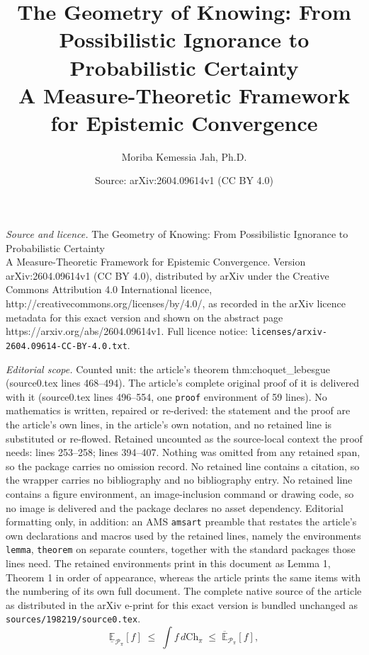 \documentclass[10pt,a4paper]{amsart}
\title{The Geometry of Knowing: From Possibilistic Ignorance to Probabilistic Certainty\\[6pt] \large A Measure-Theoretic Framework for Epistemic Convergence}
\author{Moriba Kemessia Jah, Ph.D.}
\date{Source: arXiv:2604.09614v1 (CC BY 4.0)}
\newcommand{\E}{\mathbb{E}}
\newcommand{\Ppi}{\mathcal{P}_\pi}
\begin{document}
\maketitle

\noindent\emph{Source and licence.} The Geometry of Knowing: From Possibilistic Ignorance to Probabilistic Certainty\\[6pt] \large A Measure-Theoretic Framework for Epistemic Convergence. Version arXiv:2604.09614v1 (CC BY 4.0), distributed by arXiv under the Creative Commons Attribution 4.0 International licence, http://creativecommons.org/licenses/by/4.0/, as recorded in the arXiv licence metadata for this exact version and shown on the abstract page https://arxiv.org/abs/2604.09614v1. Full licence notice: \texttt{licenses/arxiv-2604.09614-CC-BY-4.0.txt}.\par\smallskip

\noindent\textit{Editorial scope.} Counted unit: the article's theorem thm:choquet\_lebesgue (source0.tex lines 468--494). The article's complete original proof of it is delivered with it (source0.tex lines 496--554, one \texttt{proof} environment of 59 lines). No mathematics is written, repaired or re-derived: the statement and the proof are the article's own lines, in the article's own notation, and no retained line is substituted or re-flowed.  Retained uncounted as the source-local context the proof needs: lines 253--258; lines 394--407.  Nothing was omitted from any retained span, so the package carries no omission record.  No retained line contains a citation, so the wrapper carries no bibliography and no bibliography entry.  No retained line contains a figure environment, an image-inclusion command or drawing code, so no image is delivered and the package declares no asset dependency.  Editorial formatting only, in addition: an AMS \texttt{amsart} preamble that restates the article's own declarations and macros used by the retained lines, namely the environments \texttt{lemma}, \texttt{theorem} on separate counters, together with the standard packages those lines need.  The retained environments print in this document as Lemma 1, Theorem 1 in order of appearance, whereas the article prints the same items with the numbering of its own full document.  The complete native source of the article as distributed in the arXiv e-print for this exact version is bundled unchanged as \texttt{sources/198219/source0.tex}.
\begin{equation}
\underline{\E}_{\Ppi}[f]
\;\le\; \int f\,d\mathrm{Ch}_\pi
\;\le\; \overline{\E}_{\Ppi}[f],
\label{eq:choquet_sandwich}
\end{equation}
\end{document}
